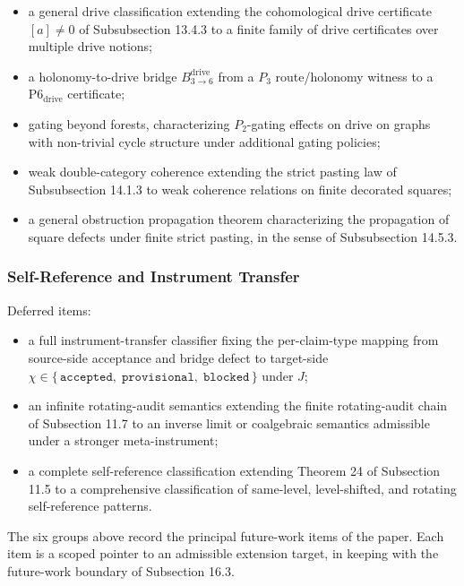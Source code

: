 \documentclass[11pt]{article}
\providecommand{\tightlist}{}
\theoremstyle{definition}
\begin{document}
\begin{itemize}
\tightlist
\item
  a general drive classification extending the cohomological drive certificate \([a]\neq 0\) of Subsubsection 13.4.3 to a finite family of drive certificates over multiple drive notions;
\item
  a holonomy-to-drive bridge \(B_{3\to 6}^{\mathrm{drive}}\) from a \(P_{3}\) route/holonomy witness to a \(\mathrm{P6}_{\mathrm{drive}}\) certificate;
\item
  gating beyond forests, characterizing \(P_{2}\)-gating effects on drive on graphs with non-trivial cycle structure under additional gating policies;
\item
  weak double-category coherence extending the strict pasting law of Subsubsection 14.1.3 to weak coherence relations on finite decorated squares;
\item
  a general obstruction propagation theorem characterizing the propagation of square defects under finite strict pasting, in the sense of Subsubsection 14.5.3.
\end{itemize}

\subsubsection{Self-Reference and Instrument Transfer}

Deferred items:

\begin{itemize}
\tightlist
\item
  a full instrument-transfer classifier fixing the per-claim-type mapping from source-side acceptance and bridge defect to target-side \(\chi\in\{\,\texttt{accepted},\;\texttt{provisional},\;\texttt{blocked}\,\}\) under \(J\);
\item
  an infinite rotating-audit semantics extending the finite rotating-audit chain of Subsection 11.7 to an inverse limit or coalgebraic semantics admissible under a stronger meta-instrument;
\item
  a complete self-reference classification extending Theorem 24 of Subsection 11.5 to a comprehensive classification of same-level, level-shifted, and rotating self-reference patterns.
\end{itemize}

The six groups above record the principal future-work items of the paper. Each item is a scoped pointer to an admissible extension target, in keeping with the future-work boundary of Subsection 16.3.
\end{document}
